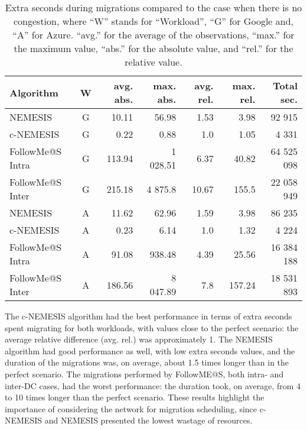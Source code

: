 \begin{table*}[h]
  \small

\caption{Extra seconds during migrations compared to the case when there is no congestion, where ``W'' stands for ``Workload'', ``G'' for Google and, ``A'' for Azure. ``avg.'' for the average of the observations, ``max.'' for the maximum value, ``abs.'' for the absolute value, and ``rel.'' for the relative value.} \label{ tab:wasted_seconds } \centering
\begin{tabular}{|l|c|r|r|r|r|r|}
  \hline  
  \textbf{Algorithm} & \textbf{W}  & \textbf{avg. abs.} &  \textbf{max. abs.} & \textbf{avg. rel.} &  \textbf{max. rel.} &  \textbf{Total sec.} \\
  
  \hline
  NEMESIS  & G & 10.11  & 56.98 & 1.53 & 3.98  & 92 915\\
  \hline
  c-NEMESIS & G & 0.22  & 0.88 & 1.0 & 1.05  & 4 331 \\
  \hline
  FollowMe@S Intra & G & 113.94  & 1 028.51 &  6.37  & 40.82  & 64 525 098 \\
  \hline
  FollowMe@S Inter & G & 215.18  & 4 875.8 & 10.67 & 155.5  & 22 058 949\\
  \hline
  NEMESIS  & A & 11.62  & 62.96 & 1.59 & 3.98  & 86 235 \\
  \hline
  c-NEMESIS & A &  0.23 & 6.14   & 1.0 & 1.32  & 4 224\\
  \hline
  FollowMe@S Intra & A & 91.08  & 938.48 & 4.39 & 25.56  & 16 384 188  \\
  \hline
  FollowMe@S Inter & A & 186.56  & 8 047.89 & 7.8 & 157.24  & 18 531 893 \\
  \hline

\end{tabular}

\end{table*}


The c-NEMESIS algorithm had the best performance in terms of extra seconds spent migrating for both workloads, with values close to the perfect scenario: the average relative difference (avg. rel.) was approximately 1. The NEMESIS algorithm had good performance as well, with low extra seconds values, and the duration of the migrations was, on average, about 1.5 times longer than in the perfect scenario. The migrations performed by FollowME@S, both intra- and inter-DC cases, had the worst performance: the duration took, on average, from 4 to 10 times longer than the perfect scenario. These results highlight the importance of considering the network for migration scheduling, since c-NEMESIS and NEMESIS presented the lowest wastage of resources.
                      

